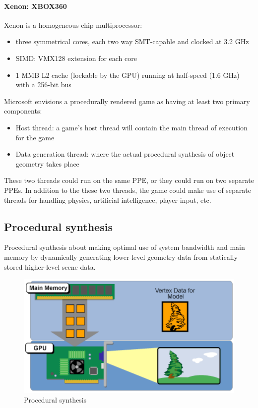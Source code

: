 \paragraph{Xenon: XBOX360}
Xenon is a homogeneous chip multiprocessor:
\begin{itemize}
    \item three symmetrical cores, each two way SMT-capable and clocked at 3.2 GHz
    \item SIMD: VMX128 extension for each core
    \item 1 MMB L2 cache (lockable by the GPU) running at half-speed (1.6 GHz) with a 256-bit bus
\end{itemize}

Microsoft envisions a procedurally rendered game
as having at least two primary components:
\begin{itemize}
    \item Host thread: a game's host thread will contain the main
thread of execution for the game
    \item Data generation thread: where the actual procedural
synthesis of object geometry takes place
\end{itemize}
These two threads could run on the same PPE, or
they could run on two separate PPEs.
In addition to the these two threads, the game
could make use of separate threads for handling
physics, artificial intelligence, player input, etc.


\subsection{Procedural synthesis}\label{subsec:procedural-synthesis}
Procedural synthesis about making optimal use of system bandwidth
and main memory by dynamically generating lower-level geometry
data from statically stored higher-level scene data.

\begin{figure}[h]
    \centering
    \includegraphics[width = \linewidth]{images/procedural-synthesis}
    \caption{Procedural synthesis}
    \label{fig:procedural-synthesis}
\end{figure}

